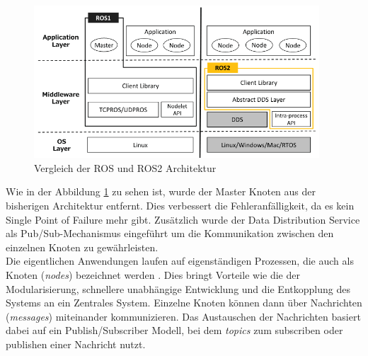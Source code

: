 \begin{figure}
  \centering
  \includegraphics[width=0.95\textwidth]{./figures/ros2-architecture.png}
  \caption{Vergleich der ROS und ROS2 Architektur \cite{maruyamaExploringPerformanceROS22016}}
  \label{fig:ros2-architecture}
\end{figure}

Wie in der Abbildung \ref{fig:ros2-architecture} zu sehen ist, wurde der Master Knoten aus der bisherigen Architektur entfernt. Dies verbessert die Fehleranfälligkeit, da es kein Single Point of Failure mehr gibt. Zusätzlich wurde der Data Distribution Service als Pub/Sub-Mechanismus eingeführt um die Kommunikation zwischen den einzelnen Knoten zu gewährleisten.\\
Die eigentlichen Anwendungen laufen auf eigenständigen Prozessen, die auch als Knoten (\textit{nodes}) bezeichnet werden \cite{maruyamaExploringPerformanceROS22016}. Dies bringt Vorteile wie die der Modularisierung, schnellere unabhängige Entwicklung und die Entkopplung des Systems an ein Zentrales System. Einzelne Knoten können dann über Nachrichten (\textit{messages}) miteinander kommunizieren. Das Austauschen der Nachrichten basiert dabei auf ein Publish/Subscriber Modell, bei dem \textit{topics} zum subscriben oder publishen einer Nachricht nutzt.


